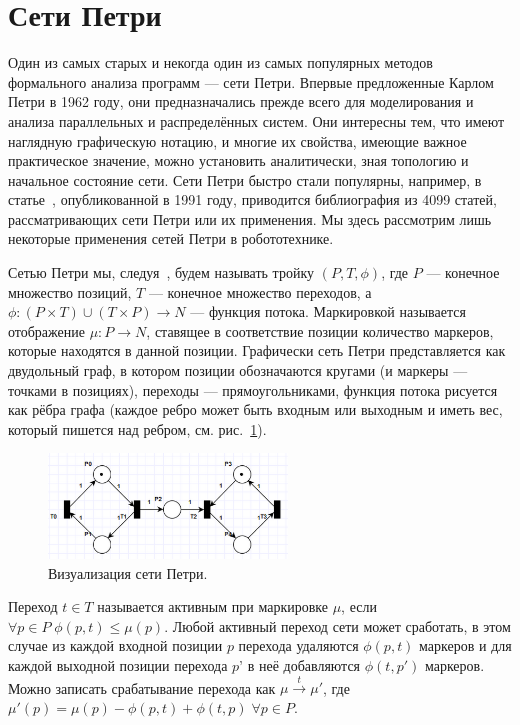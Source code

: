 \documentclass[a4, 14pt]{article}
\begin{document}
\section{Сети Петри}
Один из самых старых и некогда один из самых популярных методов формального 
анализа программ --- сети Петри. Впервые предложенные Карлом Петри в 1962 году, 
они предназначались прежде всего для моделирования и анализа параллельных и 
распределённых систем. Они интересны тем, что имеют наглядную графическую нотацию, 
и многие их свойства, имеющие важное практическое значение, можно установить 
аналитически, зная топологию и начальное состояние сети. Сети Петри быстро стали 
популярны, например, в статье~\cite{plunnecke1991bibliography}, опубликованной 
в 1991 году, приводится библиография из 4099 статей, рассматривающих сети Петри 
или их применения. Мы здесь рассмотрим лишь некоторые применения сетей Петри 
в робототехнике.

Сетью Петри мы, следуя~\cite{yen2006petri}, будем называть тройку $(P,T,\phi)$, 
где $P$ --- конечное множество позиций, $T$ --- конечное множество переходов, 
а $\phi:(P\times{T})\cup(T\times{P})\rightarrow{N}$ --- функция потока. Маркировкой 
называется отображение $\mu:P\rightarrow{N}$, ставящее в соответствие позиции 
количество маркеров, которые находятся в данной позиции. Графически сеть Петри 
представляется как двудольный граф, в котором позиции обозначаются кругами 
(и маркеры --- точками в позициях), переходы --- прямоугольниками, функция 
потока рисуется как рёбра графа (каждое ребро может быть входным или выходным 
и иметь вес, который пишется над ребром, см. рис.~\ref{image:petri}).

\begin{figure}[ht]
	\centering
	\includegraphics[width=2.5in]{petri.png}
	\caption{Визуализация сети Петри.}
	\label{image:petri}
\end{figure}

Переход $t\in{T}$ называется активным при маркировке $\mu$, если 
$\forall{p}\in{P}\;\phi(p,t)\le\mu(p)$. Любой активный переход сети может 
сработать, в этом случае из каждой входной позиции $p$ перехода удаляются 
$\phi(p,t)$ маркеров и для каждой выходной позиции перехода $p’$ в неё добавляются 
$\phi(t,p')$ маркеров. Можно записать срабатывание перехода как 
$\mu\stackrel{t}{\rightarrow}\mu'$, где $\mu'(p)=\mu(p)-\phi(p,t)+\phi(t,p)\;\forall{p}\in{P}$.
\end{document}
